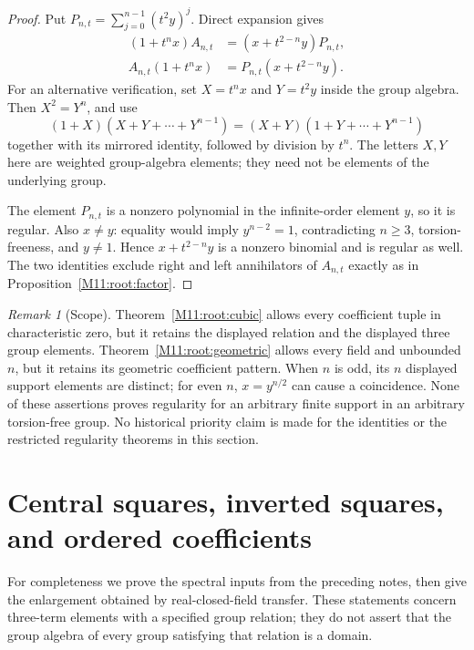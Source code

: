 \documentclass[11pt,a4paper,oneside]{report}
\theoremstyle{definition}
\theoremstyle{remark}
\newtheorem{remark}[theorem]{Remark}
\begin{document}
\begin{proof}
Put $P_{n,t}=\sum_{j=0}^{n-1}(t^2y)^j$.  Direct expansion gives
\begin{align}
 (1+t^nx)A_{n,t}
    &=(x+t^{2-n}y)P_{n,t},\label{M11:root:geometric-left}\\
 A_{n,t}(1+t^nx)
    &=P_{n,t}(x+t^{2-n}y).\label{M11:root:geometric-right}
\end{align}
For an alternative verification, set $X=t^nx$ and $Y=t^2y$
inside the group algebra.  Then $X^2=Y^n$, and use
\[
 (1+X)(X+Y+\cdots+Y^{n-1})
   =(X+Y)(1+Y+\cdots+Y^{n-1})
\]
together with its mirrored identity, followed by division by $t^n$.
The letters $X,Y$ here are weighted group-algebra elements; they
need not be elements of the underlying group.

The element $P_{n,t}$ is a nonzero polynomial in the infinite-order
element $y$, so it is regular.  Also $x\ne y$: equality would imply
$y^{n-2}=1$, contradicting $n\ge3$, torsion-freeness, and $y\ne1$.
Hence $x+t^{2-n}y$ is a nonzero binomial and is regular as well.
The two identities exclude right and left annihilators of
$A_{n,t}$ exactly as in Proposition~\ref{M11:root:factor}.
\end{proof}

\begin{remark}[Scope]
\label{M11:root:scope}
Theorem~\ref{M11:root:cubic} allows every coefficient tuple in
characteristic zero, but it retains the displayed relation and
the displayed three group elements.  Theorem~\ref{M11:root:geometric}
allows every field and unbounded $n$, but it retains its geometric
coefficient pattern.  When $n$ is odd, its $n$ displayed support
elements are distinct; for even $n$, $x=y^{n/2}$ can cause a
coincidence.  None of these assertions proves regularity for an
arbitrary finite support in an arbitrary torsion-free group.
No historical priority claim is made for the identities or the
restricted regularity theorems in this section.
\end{remark}

\section{Central squares, inverted squares, and ordered coefficients}
\label{M11:ord:section}

For completeness we prove the spectral inputs from the preceding notes,
then give the enlargement obtained by real-closed-field transfer. These
statements concern three-term elements with a specified group relation;
they do not assert that the group algebra of every group satisfying that
relation is a domain.
\end{document}

